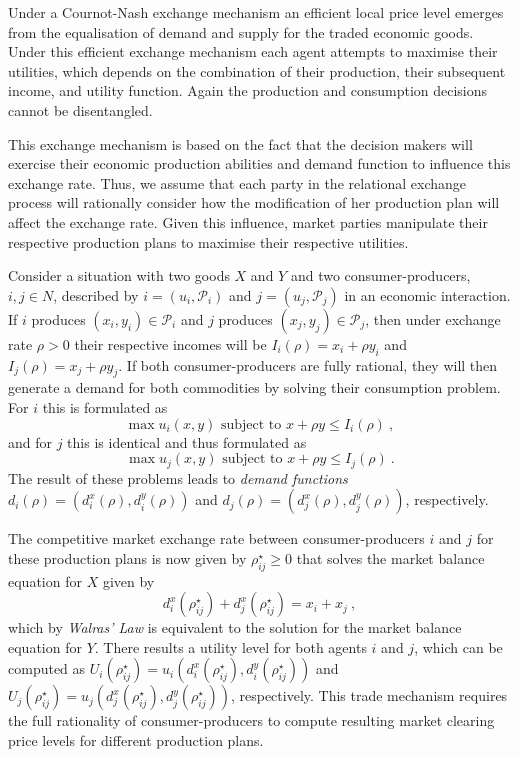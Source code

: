 Under a Cournot-Nash exchange mechanism an efficient local price level emerges from the equalisation of demand and supply for the traded economic goods. Under this efficient exchange mechanism each agent attempts to maximise their utilities, which depends on the combination of their production, their subsequent income, and utility function. Again the production and consumption decisions cannot be disentangled.

This exchange mechanism is based on the fact that the decision makers will exercise their economic production abilities and demand function to influence this exchange rate. Thus, we assume that each party in the relational exchange process will rationally consider how the modification of her production plan will affect the exchange rate. Given this influence, market parties manipulate their respective production plans to maximise their respective utilities.

Consider a situation with two goods $X$ and $Y$ and two consumer-producers, $i,j \in N$, described by $i = (u_{i}, \mathcal{P}_{i})$ and $j = (u_{j}, \mathcal{P}_{j})$ in an economic interaction. If $i$ produces $(x_{i}, y_{i}) \in \mathcal{P}_{i}$ and $j$ produces $(x_{j}, y_{j}) \in \mathcal{P}_{j}$, then under exchange rate $\rho > 0$ their respective incomes will be $I_{i}(\rho) = x_{i} + \rho y_{i}$ and $I_{j}(\rho) = x_{j} + \rho y_{j}$. If both consumer-producers are fully rational, they will then generate a demand for both commodities by solving their consumption problem. For $i$ this is formulated as
\begin{equation}
\max u_{i}(x,y) \mbox{ subject to } x + \rho y \leqslant I_{i}(\rho) ~ ,
\end{equation}
and for $j$ this is identical and thus formulated as
\begin{equation}
\max u_{j}(x,y) \mbox{ subject to } x + \rho y \leqslant I_{j}(\rho) ~ .
\end{equation}
The result of these problems leads to \emph{demand functions} $d_{i}(\rho) = \left( d^{x}_{i}(\rho), d^{y}_{i}(\rho) \right)$ and $d_{j}(\rho) = \left( d^{x}_{j}(\rho), d^{y}_{j}(\rho) \right)$, respectively.

The competitive market exchange rate between consumer-producers $i$ and $j$ for these production plans is now given by $\rho^{\star}_{ij} \geqslant 0$ that solves the market balance equation for $X$ given by
\begin{equation}
d^{x}_{i}(\rho^{\star}_{ij}) + d^{x}_{j}(\rho^{\star}_{ij}) = x_{i} + x_{j} ~ ,
\end{equation}
which by \emph{Walras' Law} is equivalent to the solution for the market balance equation for $Y$. There results a utility level for both agents $i$ and $j$, which can be computed as $U_{i}(\rho^{\star}_{ij}) = u_{i} \left( d^{x}_{i}(\rho^{\star}_{ij}), d^{y}_{i}(\rho^{\star}_{ij}) \right)$ and $U_{j}(\rho^{\star}_{ij}) = u_{j} \left( d^{x}_{j}(\rho^{\star}_{ij}), d^{y}_{j}(\rho^{\star}_{ij}) \right)$, respectively. This trade mechanism requires the full rationality of consumer-producers to compute resulting market clearing price levels for different production plans.

